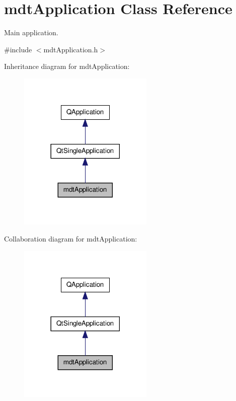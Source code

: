 \hypertarget{classmdt_application}{\section{mdt\-Application Class Reference}
\label{classmdt_application}
}


Main application.  




{\ttfamily \#include $<$mdt\-Application.\-h$>$}



Inheritance diagram for mdt\-Application\-:\nopagebreak
\begin{figure}[H]
\begin{center}
\leavevmode
\includegraphics[width=182pt]{classmdt_application__inherit__graph}
\end{center}
\end{figure}


Collaboration diagram for mdt\-Application\-:\nopagebreak
\begin{figure}[H]
\begin{center}
\leavevmode
\includegraphics[width=182pt]{classmdt_application__coll__graph}
\end{center}
\end{figure}
